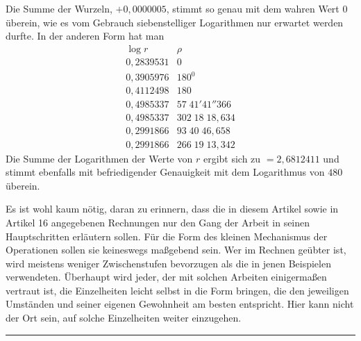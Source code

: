Die Summe der Wurzeln, $+0{,}0000005$, stimmt so genau mit dem wahren Wert $0$ überein, wie es vom Gebrauch siebenstelliger Logarithmen nur erwartet werden durfte. In der anderen Form hat man
\[
\begin{array}{r|r}
\log r&\rho\\\hline
0{,}2839531&0\\
0{,}3905976&180^{0}\\
0{,}4112498&180\\
0{,}4985337&57\;41'41''366\\
0{,}4985337&302\;18\;18{,}634\\
0{,}2991866&93\;40\;46{,}658\\
0{,}2991866&266\;19\;13{,}342
\end{array}
\]
Die Summe der Logarithmen der Werte von $r$ ergibt sich zu $=2{,}6812411$ und stimmt ebenfalls mit befriedigender Genauigkeit mit dem Logarithmus von $480$ überein.

Es ist wohl kaum nötig, daran zu erinnern, dass die in diesem Artikel sowie in Artikel 16 angegebenen Rechnungen nur den Gang der Arbeit in seinen Hauptschritten erläutern sollen. Für die Form des kleinen Mechanismus der Operationen sollen sie keineswegs maßgebend sein. Wer im Rechnen geübter ist, wird meistens weniger Zwischenstufen bevorzugen als die in jenen Beispielen verwendeten. Überhaupt wird jeder, der mit solchen Arbeiten einigermaßen vertraut ist, die Einzelheiten leicht selbst in die Form bringen, die den jeweiligen Umständen und seiner eigenen Gewohnheit am besten entspricht. Hier kann nicht der Ort sein, auf solche Einzelheiten weiter einzugehen.
\begin{center}\rule{0.25\linewidth}{0.3pt}\end{center}

